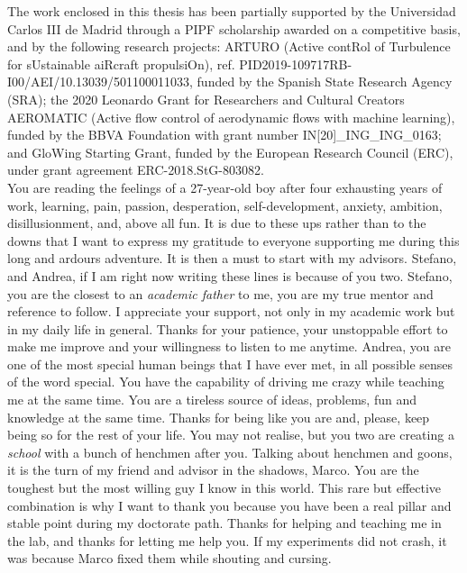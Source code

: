 \begin{acknowledgements}
%
The work enclosed in this thesis has been partially supported by the Universidad Carlos III de Madrid through a PIPF
scholarship awarded on a competitive basis, and by the following research projects: ARTURO (Active contRol of Turbulence for sUstainable aiRcraft propulsiOn), ref. PID2019-109717RB-I00/AEI/10.13039/501100011033, funded by the Spanish State Research Agency (SRA); the 2020 Leonardo Grant for Researchers and Cultural Creators AEROMATIC (Active flow control of aerodynamic flows with machine learning), funded by the BBVA Foundation with grant number IN[20]\_ING\_ING\_0163; and GloWing Starting Grant, funded by the European Research Council (ERC), under grant agreement ERC-2018.StG-803082.\\

You are reading the feelings of a 27-year-old boy after four exhausting years of work, learning, pain, passion, desperation, self-development, anxiety, ambition, disillusionment, and, above all fun. It is due to these ups rather than to the downs that I want to express my gratitude to everyone supporting me during this long and ardours adventure. It is then a must to start with my advisors. Stefano, and Andrea, if I am right now writing these lines is because of you two. Stefano, you are the closest to an \textit{academic father} to me, you are my true mentor and reference to follow. I appreciate your support, not only in my academic work but in my daily life in general. Thanks for your patience, your unstoppable effort to make me improve and your willingness to listen to me anytime. Andrea, you are one of the most special human beings that I have ever met, in all possible senses of the word special. You have the capability of driving me crazy while teaching me at the same time. You are a tireless source of ideas, problems, fun and knowledge at the same time. Thanks for being like you are and, please, keep being so for the rest of your life. You may not realise, but you two are creating a \textit{school} with a bunch of henchmen after you. Talking about henchmen and goons, it is the turn of my friend and advisor in the shadows, Marco. You are the toughest but the most willing guy I know in this world. This rare but effective combination is why I want to thank you because you have been a real pillar and stable point during my doctorate path. Thanks for helping and teaching me in the lab, and thanks for letting me help you. If my experiments did not crash, it was because Marco fixed them while shouting and cursing.


\end{acknowledgements}
